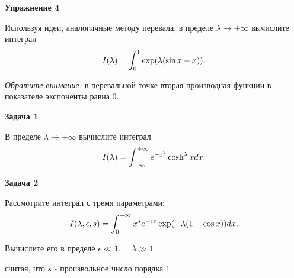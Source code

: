 \documentclass[a4paper,12pt]{article}
\begin{document}
\vspace{15pt}
\noindent \textbf{Упражнение 4}

\noindent Используя идеи, аналогичные методу перевала, в пределе $\lambda\rightarrow+\infty$ вычислите интеграл
\begin{equation}\notag
I(\lambda)	=\int_{0}^{1}\exp(\lambda(\sin x-x)).
\end{equation}

\noindent \textit{Обратите внимание:} в перевальной точке вторая производная функции в показателе экспоненты равна 0.

\vspace{15pt}
\noindent \textbf{Задача 1}

\noindent В пределе $\lambda\rightarrow+\infty$ вычислите интеграл
\begin{equation}\notag
I(\lambda)	=\int_{-\infty}^{+\infty}e^{-x^{2}}\cosh^{\lambda}xdx.
\end{equation}

\vspace{15pt}
\noindent \textbf{Задача 2}

\noindent Рассмотрите интеграл с тремя параметрами:
\begin{equation}\notag
I(\lambda,\epsilon,s)	=\int_{0}^{+\infty}x^{s}e^{-\epsilon x}\exp(-\lambda(1-\cos x))dx.
\end{equation}

\noindent Вычислите его в пределе $\epsilon	\ll 1$, $\quad\lambda\gg1$,

\noindent считая, что $s$ - произвольное число порядка $1$.
\end{document}

